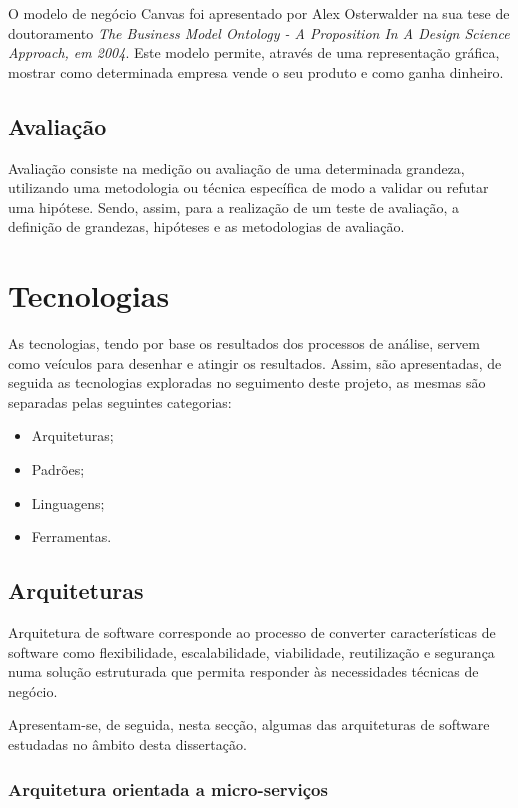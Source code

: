 O modelo de negócio Canvas foi apresentado por Alex Osterwalder na sua tese de doutoramento \emph{The Business Model Ontology - A Proposition In A Design Science Approach, em 2004}. Este modelo permite, através de uma representação gráfica, mostrar como determinada empresa vende o seu produto  e como ganha dinheiro\cite{canvas}.

\subsection{Avaliação \label{estado_arte_avaliacao}}
Avaliação consiste na medição ou avaliação de uma determinada grandeza, utilizando uma metodologia ou técnica específica de modo a validar ou refutar uma hipótese. Sendo, assim, para a realização de um teste de avaliação, a definição de grandezas, hipóteses e as metodologias de avaliação\cite{experimentation_principles}.

\section{Tecnologias\label{section_tecnologias}}
As tecnologias, tendo por base os resultados dos processos de análise, servem como veículos para desenhar e atingir os resultados. Assim, são apresentadas, de seguida as tecnologias exploradas no seguimento deste projeto, as mesmas são separadas pelas seguintes categorias:
\begin{itemize}
    \item Arquiteturas;
    \item Padrões;
    \item Linguagens;
    \item Ferramentas.
\end{itemize}

\subsection{Arquiteturas}
Arquitetura de software corresponde ao processo de converter características de software como flexibilidade, escalabilidade, viabilidade, reutilização e segurança numa solução estruturada que permita responder às necessidades técnicas de negócio\cite{software_architecture}.

Apresentam-se, de seguida, nesta secção, algumas das arquiteturas de software estudadas no âmbito desta dissertação.

\subsubsection*{Arquitetura orientada a micro-serviços}

